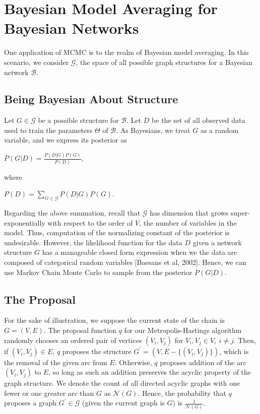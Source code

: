 \documentclass[12pt,twoside]{reedthesis}
\begin{document}
	\section{Bayesian Model Averaging for Bayesian Networks}
	One application of MCMC is to the realm of Bayesian model averaging. 
	In this scenario, we consider $\mathcal G$, the space of all possible graph structures for a Bayesian network $\mathcal B$.
		\subsection*{Being Bayesian About Structure}
			Let $G \in \mathcal G$ be a possible structure for $\mathcal B$. 
			Let $D$ be the set of all observed data used to train the parameters $\Theta$ of $\mathcal B$. 
			As Bayesians, we treat $G$ as a random variable, and we express its posterior as
			\begin{center}
				$P(G | D) = \displaystyle \frac{P(D|G)P(G)}{P(D)}$,
			\end{center}
			where
			\begin{center}
				$P(D) = \displaystyle \sum_{G \in \mathcal G}P(D | G) P(G)$.
			\end{center}
			Regarding the above summation, recall that $\mathcal G$ has dimension that grows super-exponentially with respect to the order of $V$, the number of variables in the model. 
			Thus, computation of the normalizing constant of the posterior is undesirable. 
			However, the likelihood function for the data $D$ given a network structure $G$ has a manageable closed form expression when we the data are composed of categorical random variables [Baesans et al, 2002]. 
			Hence, we can use Markov Chain Monte Carlo to sample from the posterior $P(G | D)$.
			
		\subsection*{The Proposal}
			For the sake of illustration, we suppose the current state of the chain is $G=(V,E)$. 
			The proposal function $q$ for our Metropolis-Hastings algorithm randomly chooses an ordered pair of vertices $(V_i, V_j)$ for $V_i, V_j \in V, \ i \neq j$. 
			Then, if $(V_i, V_j) \in E$, $q$ proposes the structure $G^{'} = (V,E - \{(V_i,V_j)\})$, which is the removal of the given arc from $E$. 
			Otherwise, $q$ proposes addition of the arc $(V_i, V_j)$ to $E$, so long as such an addition preserves the acyclic property of the graph structure. 
			We denote the count of all directed acyclic graphs with one fewer or one greater arc than $G$ as $\mathcal{N}(G)$. 
			Hence, the probability that $q$ proposes a graph $G^{'} \in \mathcal G$ (given the current graph is $G$) is $\frac{1}{\mathcal{N}(G)}$.
			
\end{document}
